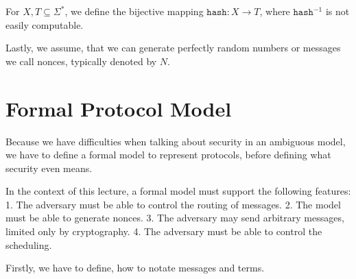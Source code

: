\newcommand{\hash}{\texttt{hash}}
\begin{definition}
    For \(X, T \subseteq \Sigma^*\), we define the bijective mapping \(\hash : X \rightarrow T\), where \(\hash^{-1}\) is not easily computable.
\end{definition}

\begin{definition}
    Lastly, we assume, that we can generate perfectly random numbers or messages we call nonces, typically denoted by \(N\).
\end{definition}

\section{Formal Protocol Model}
Because we have difficulties when talking about security in an ambiguous model, we have to define a formal model to represent protocols, before defining what security even means.

In the context of this lecture, a formal model must support the following features:
1. The adversary must be able to control the routing of messages.
2. The model must be able to generate nonces.
3. The adversary may send arbitrary messages, limited only by cryptography.
4. The adversary must be able to control the scheduling.

Firstly, we have to define, how to notate messages and terms.

